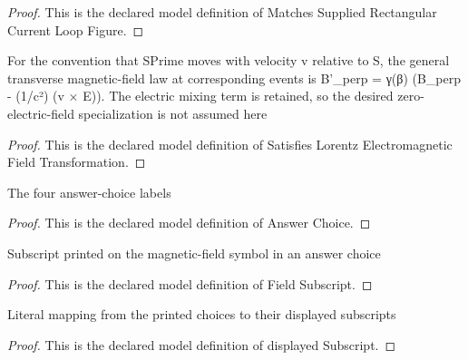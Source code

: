 \begin{proof}
  This is the declared model definition of Matches Supplied Rectangular Current Loop Figure.
\end{proof}
\begin{definition}
  \label{def:physics:phyx-mini-0609:phyxminiproblems-problemphyxmini0609-satisfieslorentzelectromagneticfieldtransformation}
  For the convention that SPrime moves with velocity v relative to S, the general transverse magnetic-field law at corresponding events is B'\_perp = γ(β) (B\_perp - (1/c²) (v × E)). The electric mixing term is retained, so the desired zero-electric-field specialization is not assumed here
\end{definition}
\begin{proof}
  This is the declared model definition of Satisfies Lorentz Electromagnetic Field Transformation.
\end{proof}
\begin{definition}
  \label{def:physics:phyx-mini-0609:phyxminiproblems-problemphyxmini0609-answerchoice}
  The four answer-choice labels
\end{definition}
\begin{proof}
  This is the declared model definition of Answer Choice.
\end{proof}
\begin{definition}
  \label{def:physics:phyx-mini-0609:phyxminiproblems-problemphyxmini0609-fieldsubscript}
  Subscript printed on the magnetic-field symbol in an answer choice
\end{definition}
\begin{proof}
  This is the declared model definition of Field Subscript.
\end{proof}
\begin{definition}
  \label{def:physics:phyx-mini-0609:phyxminiproblems-problemphyxmini0609-displayedsubscript}
  Literal mapping from the printed choices to their displayed subscripts
\end{definition}
\begin{proof}
  This is the declared model definition of displayed Subscript.
\end{proof}
